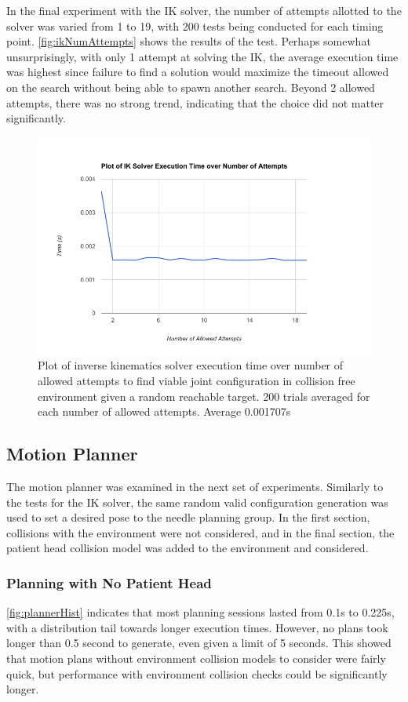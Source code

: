 \documentclass[12pt]{report}
\begin{document}
In the final experiment with the IK solver, the number of attempts allotted to the solver was varied from 1 to 19, with 200 tests being conducted for each timing point. \autoref{fig:ikNumAttempts} shows the results of the test. Perhaps somewhat unsurprisingly, with only 1 attempt at solving the IK, the average execution time was highest since failure to find a solution would maximize the timeout allowed on the search without being able to spawn another search. Beyond 2 allowed attempts, there was no strong trend, indicating that the choice did not matter significantly.

\begin{figure}[thpb]
	\centering
	\includegraphics[width = 5in]{graphs/ik_sover_over_time.png}
    \caption{Plot of inverse kinematics solver execution time over number of allowed attempts to find viable joint configuration in collision free environment given a random reachable target. 200 trials averaged for each number of allowed attempts. Average 0.001707s}
    \label{fig:ikNumAttempts}
\end{figure}

\subsection{Motion Planner}
The motion planner was examined in the next set of experiments. Similarly to the tests for the IK solver, the same random valid configuration generation was used to set a desired pose to the needle planning group. In the first section, collisions with the environment were not considered, and in the final section, the patient head collision model was added to the environment and considered.

\subsubsection{Planning with No Patient Head}
\autoref{fig:plannerHist} indicates that most planning sessions lasted from 0.1s to 
0.225s, with a distribution tail towards longer execution times. However, no plans took longer than 0.5 second to generate, even given a limit of 5 seconds. This showed that motion plans without environment collision models to consider were fairly quick, but performance with environment collision checks could be significantly longer.
\end{document}
